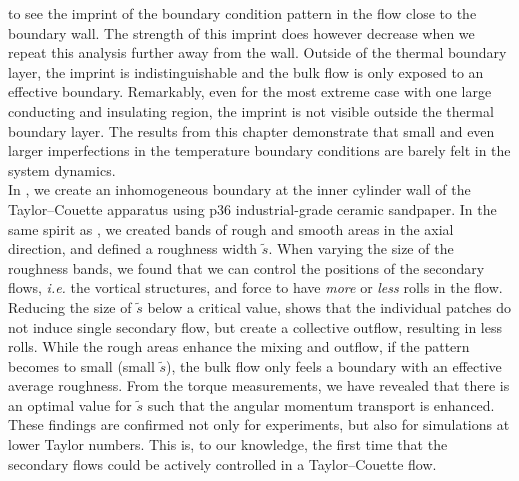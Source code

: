 to see the imprint of the boundary condition pattern in the flow close to the
boundary wall.
The strength of this imprint does however decrease when we repeat this
analysis further away from the wall.
Outside of the thermal boundary layer, the imprint is indistinguishable and
the bulk flow is only exposed to an effective boundary.
Remarkably, even for the most extreme case with one large conducting and
insulating region, the imprint is not visible outside the thermal boundary
layer.
The results from this chapter demonstrate that small and even larger
imperfections in the temperature boundary conditions are barely felt in the
system dynamics.\\
\indent In , we create an inhomogeneous boundary at the
inner cylinder wall of the Taylor--Couette apparatus using p36
industrial-grade ceramic sandpaper.
In the same spirit as , we created bands of rough and
smooth areas in the axial direction, and defined a roughness width $\tilde s$. 
When varying the size of the roughness bands, we found that we can control the
positions of the secondary flows, \textit{i.e.} the vortical structures, and
force to have \emph{more} or \emph{less} rolls in the flow.
Reducing the size of $\tilde s$ below a critical value, shows that the individual
patches do not induce single secondary flow, but create a collective outflow,
resulting in less rolls.
While the rough areas enhance the mixing and outflow, if the pattern becomes
to small (small $\tilde s$), the bulk flow only feels a boundary with an
effective average roughness.
From the torque measurements, we have revealed that there is an optimal value
for $\tilde s$ such that the angular momentum transport is enhanced.
These findings are confirmed not only for experiments, but also for
simulations at lower Taylor numbers.
This is, to our knowledge, the first time that the secondary flows could be
actively controlled in a Taylor--Couette flow.

